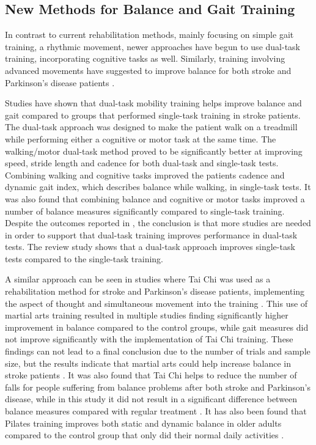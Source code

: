 \subsection{New Methods for Balance and Gait Training}

In contrast to current rehabilitation methods, mainly focusing on simple gait training, a rhythmic movement, newer approaches have begun to use dual-task training, incorporating cognitive tasks as well. Similarly, training involving advanced movements have suggested to improve balance for both stroke and Parkinson's disease patients \cite{Ding2012,Winser2018}. 

Studies have shown that dual-task mobility training helps improve balance and gait compared to groups that performed single-task training in stroke patients. The dual-task approach was designed to make the patient walk on a treadmill while performing either a cognitive or motor task at the same time. \cite{He2018}
The walking/motor dual-task method proved to be significantly better at improving speed, stride length and cadence for both dual-task and single-task tests. Combining walking and cognitive tasks improved the patients cadence and dynamic gait index, which describes balance while walking, in single-task tests. It was also found that combining balance and cognitive or motor tasks improved a number of balance measures significantly compared to single-task training. \cite{He2018}
Despite the outcomes reported in \cite{He2018}, the conclusion is that more studies are needed in order to support that dual-task training improves performance in dual-task tests. The review study shows that a dual-task approach improves single-task tests compared to the single-task training. \cite{He2018}

A similar approach can be seen in studies where Tai Chi was used as a rehabilitation method for stroke and Parkinson's disease patients, implementing the aspect of thought and simultaneous movement into the training \cite{Ding2012,Winser2018}. This use of martial arts training resulted in multiple studies finding significantly higher improvement in balance compared to the control groups, while gait measures did not improve significantly with the implementation of Tai Chi training. \cite{Ding2012}
These findings can not lead to a final conclusion due to the number of trials and sample size, but the results indicate that martial arts could help increase balance in stroke patients \cite{Ding2012}. It was also found that Tai Chi helps to reduce the number of falls for people suffering from balance problems after both stroke and Parkinson's disease, while in this study it did not result in a significant difference between balance measures compared with regular treatment \cite{Winser2018}. It has also been found that Pilates training improves both static and dynamic balance in older adults compared to the control group that only did their normal daily activities \cite{Moreno2017}.